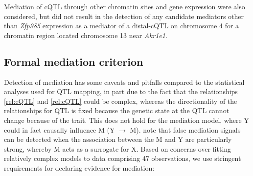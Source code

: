 \documentclass[10pt,letterpaper,twoside]{article}
\begin{document}
Mediation of cQTL through other chromatin sites and gene expression were also considered, but did not result in the detection of any candidate mediators other than \textit{Zfp985} expression as a mediator of a distal-cQTL on chromosome 4 for a chromatin region located chromosome 13 near \textit{Akr1e1}.

\subsection*{Formal mediation criterion}

Detection of mediation has some caveats and pitfalls compared to the statistical analyses used for QTL mapping, in part due to the fact that the relationships \ref{rel:eQTL} and \ref{rel:cQTL} could be complex, whereas the directionality of the relationships for QTL is fixed because the genetic state at the QTL cannot change because of the trait. This does not hold for the mediation model, where Y could in fact causally influence M (Y $\rightarrow$ M). \cite{Didelez2007} note that false mediation signals can be detected when the association between the M and Y are particularly strong, whereby M acts as a surrogate for X. Based on concerns over fitting relatively complex models to data comprising 47 observations, we use stringent requirements for declaring evidence for mediation:
\end{document}
